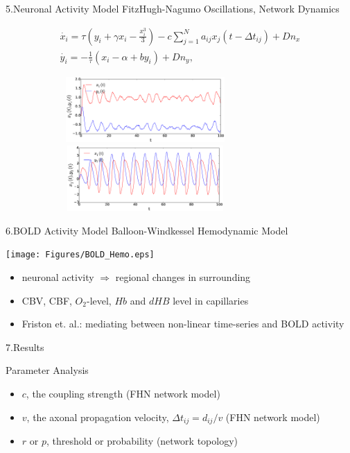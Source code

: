 \documentclass{beamer}
\begin{document}
\begin{frame}{5.Neuronal Activity Model}
\footnotesize{FitzHugh-Nagumo Oscillations, Network Dynamics }

\begin{subequations}
 \begin{align}\dot{x_i} = \tau \left( y_i + \gamma x_i - \frac{x_i^3}{3} \right) -c \sum_{j=1}^N a_{ij}x_j(t - \Delta t_{ij}) +Dn_x \label{eqn: frobenius 3}\\  \dot{y_i} = -\frac{1}{\tau} (x_i - \alpha + b y_i  ) +Dn_y \label{eqn: frobenius 18}  , \end{align} 
\end{subequations}

  \centering
	\includegraphics[width=0.8\textwidth, height=2.5cm]{Figures/FHN_time_1.eps} \\
 	\includegraphics[width=0.8\textwidth, height=2.5cm]{Figures/FHN_time_2.eps}

\end{frame}

\begin{frame}{6.BOLD Activity Model}
\footnotesize{Balloon-Windkessel Hemodynamic Model}

\centering
\texttt{[image: Figures/BOLD\_Hemo.eps]}

\begin{itemize}
 \item neuronal activity  $\Rightarrow$ regional changes in surrounding
 \item CBV, CBF, $O_2$-level, $Hb$ and $dHB$ level in capillaries 
 \item Friston et. al.: mediating between non-linear time-series and BOLD activity 
\end{itemize}

\end{frame}


\begin{frame}{7.Results}

Parameter Analysis
\begin{itemize}
\item  $c$, the coupling strength (FHN network model) 
\item  $v$, the axonal propagation velocity, $\Delta t_{ij} = d_{ij}/v$ (FHN network model)
\item  $r$ or $p$, threshold or probability (network topology)

\end{itemize}

\end{frame}
\end{document}
